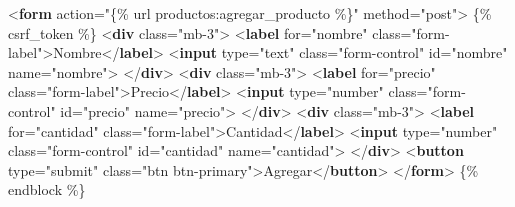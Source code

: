 \documentclass[
  a4paper,
  DIV=11,
  numbers=noendperiod,
  onepage,
  openany]{scrreprt}
\newenvironment{Shaded}{\begin{snugshade}}{\end{snugshade}}
\newcommand{\DataTypeTok}[1]{\textcolor[rgb]{0.68,0.00,0.00}{#1}}
\newcommand{\KeywordTok}[1]{\textcolor[rgb]{0.00,0.23,0.31}{\textbf{#1}}}
\newcommand{\NormalTok}[1]{\textcolor[rgb]{0.00,0.23,0.31}{#1}}
\newcommand{\OperatorTok}[1]{\textcolor[rgb]{0.37,0.37,0.37}{#1}}
\newcommand{\OtherTok}[1]{\textcolor[rgb]{0.00,0.23,0.31}{#1}}
\newcommand{\StringTok}[1]{\textcolor[rgb]{0.13,0.47,0.30}{#1}}
\begin{document}
\begin{tcolorbox}
\begin{Shaded}
\begin{Highlighting}[]
\DataTypeTok{\textless{}}\KeywordTok{form}\OtherTok{ action}\OperatorTok{=}\StringTok{"\{\% url \textquotesingle{}productos:agregar\_producto\textquotesingle{} \%\}"}\OtherTok{ method}\OperatorTok{=}\StringTok{"post"}\DataTypeTok{\textgreater{}}
\NormalTok{    \{\% csrf\_token \%\}}
    \DataTypeTok{\textless{}}\KeywordTok{div}\OtherTok{ class}\OperatorTok{=}\StringTok{"mb{-}3"}\DataTypeTok{\textgreater{}}
        \DataTypeTok{\textless{}}\KeywordTok{label}\OtherTok{ for}\OperatorTok{=}\StringTok{"nombre"}\OtherTok{ class}\OperatorTok{=}\StringTok{"form{-}label"}\DataTypeTok{\textgreater{}}\NormalTok{Nombre}\DataTypeTok{\textless{}/}\KeywordTok{label}\DataTypeTok{\textgreater{}}
        \DataTypeTok{\textless{}}\KeywordTok{input}\OtherTok{ type}\OperatorTok{=}\StringTok{"text"}\OtherTok{ class}\OperatorTok{=}\StringTok{"form{-}control"}\OtherTok{ id}\OperatorTok{=}\StringTok{"nombre"}\OtherTok{ name}\OperatorTok{=}\StringTok{"nombre"}\DataTypeTok{\textgreater{}}
    \DataTypeTok{\textless{}/}\KeywordTok{div}\DataTypeTok{\textgreater{}}
    \DataTypeTok{\textless{}}\KeywordTok{div}\OtherTok{ class}\OperatorTok{=}\StringTok{"mb{-}3"}\DataTypeTok{\textgreater{}}
        \DataTypeTok{\textless{}}\KeywordTok{label}\OtherTok{ for}\OperatorTok{=}\StringTok{"precio"}\OtherTok{ class}\OperatorTok{=}\StringTok{"form{-}label"}\DataTypeTok{\textgreater{}}\NormalTok{Precio}\DataTypeTok{\textless{}/}\KeywordTok{label}\DataTypeTok{\textgreater{}}
        \DataTypeTok{\textless{}}\KeywordTok{input}\OtherTok{ type}\OperatorTok{=}\StringTok{"number"}\OtherTok{ class}\OperatorTok{=}\StringTok{"form{-}control"}\OtherTok{ id}\OperatorTok{=}\StringTok{"precio"}\OtherTok{ name}\OperatorTok{=}\StringTok{"precio"}\DataTypeTok{\textgreater{}}
    \DataTypeTok{\textless{}/}\KeywordTok{div}\DataTypeTok{\textgreater{}}
    \DataTypeTok{\textless{}}\KeywordTok{div}\OtherTok{ class}\OperatorTok{=}\StringTok{"mb{-}3"}\DataTypeTok{\textgreater{}}
        \DataTypeTok{\textless{}}\KeywordTok{label}\OtherTok{ for}\OperatorTok{=}\StringTok{"cantidad"}\OtherTok{ class}\OperatorTok{=}\StringTok{"form{-}label"}\DataTypeTok{\textgreater{}}\NormalTok{Cantidad}\DataTypeTok{\textless{}/}\KeywordTok{label}\DataTypeTok{\textgreater{}}
        \DataTypeTok{\textless{}}\KeywordTok{input}\OtherTok{ type}\OperatorTok{=}\StringTok{"number"}\OtherTok{ class}\OperatorTok{=}\StringTok{"form{-}control"}\OtherTok{ id}\OperatorTok{=}\StringTok{"cantidad"}\OtherTok{ name}\OperatorTok{=}\StringTok{"cantidad"}\DataTypeTok{\textgreater{}}
    \DataTypeTok{\textless{}/}\KeywordTok{div}\DataTypeTok{\textgreater{}}
    \DataTypeTok{\textless{}}\KeywordTok{button}\OtherTok{ type}\OperatorTok{=}\StringTok{"submit"}\OtherTok{ class}\OperatorTok{=}\StringTok{"btn btn{-}primary"}\DataTypeTok{\textgreater{}}\NormalTok{Agregar}\DataTypeTok{\textless{}/}\KeywordTok{button}\DataTypeTok{\textgreater{}}
\DataTypeTok{\textless{}/}\KeywordTok{form}\DataTypeTok{\textgreater{}}
\NormalTok{\{\% endblock \%\}}
\end{Highlighting}
\end{Shaded}


\end{tcolorbox}
\end{document}
